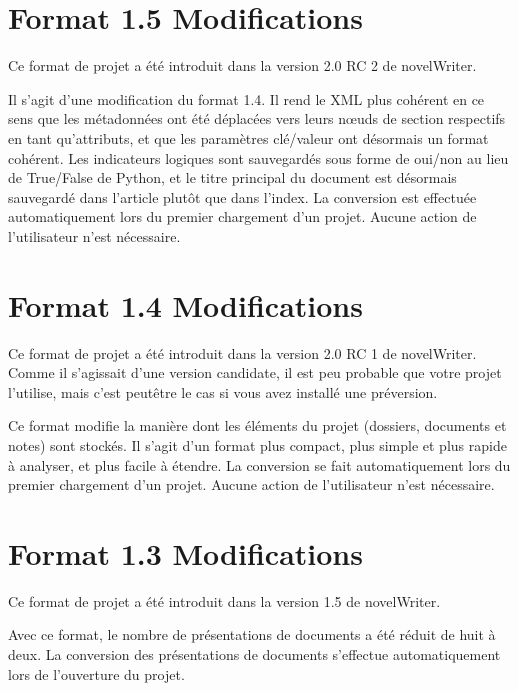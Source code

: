 \documentclass[a4paper,11pt,french]{sphinxmanual}
\begin{document}
\section{Format 1.5 Modifications}
\label{\detokenize{more_projectformat:format-1-5-changes}}\label{\detokenize{more_projectformat:a-prjfmt-1-5}}
\sphinxAtStartPar
Ce format de projet a été introduit dans la version 2.0 RC 2 de novelWriter.

\sphinxAtStartPar
Il s’agit d’une modification du format 1.4. Il rend le XML plus cohérent en ce sens que les métadonnées ont été déplacées vers leurs nœuds de section respectifs en tant qu’attributs, et que les paramètres clé/valeur ont désormais un format cohérent. Les indicateurs logiques sont sauvegardés sous forme de oui/non au lieu de True/False de Python, et le titre principal du document est désormais sauvegardé dans l’article plutôt que dans l’index. La conversion est effectuée automatiquement lors du premier chargement d’un projet. Aucune action de l’utilisateur n’est nécessaire.


\section{Format 1.4 Modifications}
\label{\detokenize{more_projectformat:format-1-4-changes}}\label{\detokenize{more_projectformat:a-prjfmt-1-4}}
\sphinxAtStartPar
Ce format de projet a été introduit dans la version 2.0 RC 1 de novelWriter. Comme il s’agissait d’une version candidate, il est peu probable que votre projet l’utilise, mais c’est peut\sphinxhyphen{}être le cas si vous avez installé une préversion.

\sphinxAtStartPar
Ce format modifie la manière dont les éléments du projet (dossiers, documents et notes) sont stockés. Il s’agit d’un format plus compact, plus simple et plus rapide à analyser, et plus facile à étendre. La conversion se fait automatiquement lors du premier chargement d’un projet. Aucune action de l’utilisateur n’est nécessaire.


\section{Format 1.3 Modifications}
\label{\detokenize{more_projectformat:format-1-3-changes}}\label{\detokenize{more_projectformat:a-prjfmt-1-3}}
\sphinxAtStartPar
Ce format de projet a été introduit dans la version 1.5 de novelWriter.

\sphinxAtStartPar
Avec ce format, le nombre de présentations de documents a été réduit de huit à deux. La conversion des présentations de documents s’effectue automatiquement lors de l’ouverture du projet.
\end{document}
